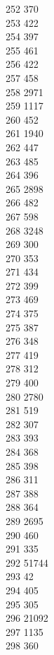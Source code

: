 { 252	370 \\
 253	422 \\
 254	397 \\
 255	461 \\
 256	422 \\
 257	458 \\
 258	2971 \\
 259	1117 \\
 260	452 \\
 261	1940 \\
 262	447 \\
 263	485 \\
 264	396 \\
 265	2898 \\
 266	482 \\
 267	598 \\
 268	3248 \\
 269	300 \\
 270	353 \\
 271	434 \\
 272	399 \\
 273	469 \\
 274	375 \\
 275	387 \\
 276	348 \\
 277	419 \\
 278	312 \\
 279	400 \\
 280	2780 \\
 281	519 \\
 282	307 \\
 283	393 \\
 284	368 \\
 285	398 \\
 286	311 \\
 287	388 \\
 288	364 \\
 289	2695 \\
 290	460 \\
 291	335 \\
 292	51744 \\
 293	42 \\
 294	405 \\
 295	305 \\
 296	21092 \\
 297	1135 \\
 298	360 \\
}
